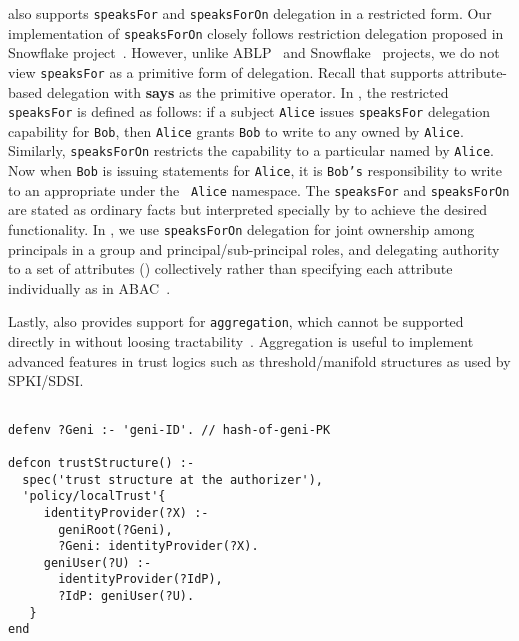 { also supports {\tt speaksFor} and {\tt speaksForOn} delegation
in a restricted form. Our implementation of {\tt speaksForOn} closely follows
restriction delegation proposed in Snowflake
project~\cite{Howell:2000:FSS:867818, Howell:2000}.  However, unlike
ABLP~\cite{abadi93:accesscalculus} and Snowflake~\cite{Howell:2000:FSS:867818}
projects, we do not view {\tt speaksFor} as a primitive form of delegation.
Recall that  supports attribute-based delegation with {\bf says}
as the primitive operator. In , the restricted {\tt speaksFor} is
defined as follows: if a subject {\tt Alice} issues {\tt speaksFor} delegation
capability for {\tt Bob}, then {\tt Alice} grants {\tt Bob} to write to any
 owned by {\tt Alice}. Similarly, {\tt speaksForOn} restricts
the capability to a particular  named by {\tt Alice}. Now when
{\tt Bob} is issuing statements for {\tt Alice}, it is {\tt Bob's}
responsibility to write to an appropriate  under the {\tt
Alice} namespace. The {\tt speaksFor} and {\tt speaksForOn} are stated as
ordinary  facts but interpreted specially by  to
achieve the desired functionality. In , we use {\tt speaksForOn}
delegation for joint ownership among principals in a group and
principal/sub-principal roles, and delegating authority to a set of attributes
() collectively rather than specifying each attribute
individually as in ABAC~\cite{rt-abac}.

Lastly,  also provides support for {\tt aggregation}, which
cannot be supported directly in  without loosing
tractability~\cite{Grohe:2010}.  Aggregation is useful to
implement advanced features in trust logics such as threshold/manifold
structures as used by SPKI/SDSI.






\begin{lstlisting}[float, showstringspaces=false, caption={Project Investigator (PI) relies on local trust policy and bearer reference passed by the {\tt ?Subject} to determine whether {\tt ?Subject} is a valid geni user.}, label=code:pi]

defenv ?Geni :- 'geni-ID'. // hash-of-geni-PK

defcon trustStructure() :-
  spec('trust structure at the authorizer'),
  'policy/localTrust'{
     identityProvider(?X) :- 
       geniRoot(?Geni), 
       ?Geni: identityProvider(?X).
     geniUser(?U) :- 
       identityProvider(?IdP), 
       ?IdP: geniUser(?U).
   }
end


\end{lstlisting}}
